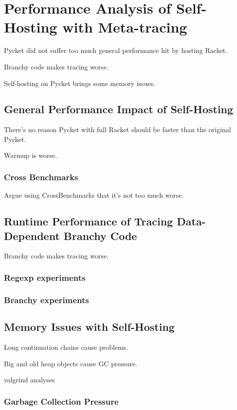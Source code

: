\chapter{Performance Analysis of Self-Hosting with Meta-tracing}

	\begin{chapterpoint}
		Pycket did not suffer too much general performance hit by hosting Racket.

		Branchy code makes tracing worse.

		Self-hosting on Pycket brings some memory issues.
	\end{chapterpoint}

	\section{General Performance Impact of Self-Hosting}
	
		\begin{mainpoint}
			There's no reason Pycket with full Racket should be faster than the original Pycket.

			Warmup is worse.
		\end{mainpoint}

		\subsection{Cross Benchmarks}

			\begin{mainpoint}
				Argue using CrossBenchmarks that it's not too much worse.
			\end{mainpoint}

	\section{Runtime Performance of Tracing Data-Dependent Branchy Code}
		\begin{mainpoint}
			Branchy code makes tracing worse.
		\end{mainpoint}

		\subsection{Regexp experiments}
		\subsection{Branchy experiments}

	\section{Memory Issues with Self-Hosting}
		\begin{mainpoint}
			Long continuation chains cause problems.

			Big and old heap objects cause GC pressure.
		\end{mainpoint}
		
		valgrind analyses

		\subsection{Garbage Collection Pressure}
